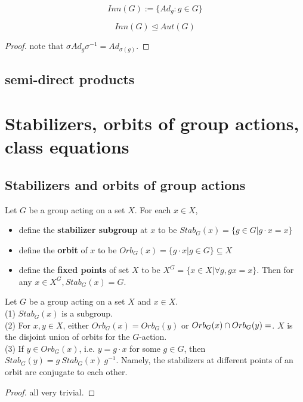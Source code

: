 \documentclass[11pt,fleqn]{book} %
\begin{document}
\begin{CJK}{UTF8}{gkai}
\begin{definition}
	\[Inn(G) := \{Ad_g: g\in G\}\]
\end{definition}
\begin{proposition}
	\[Inn(G) \unlhd Aut(G)\]
\end{proposition}
\begin{proof}
	note that $\sigma Ad_g \sigma^{-1} = Ad_{\sigma(g)} $.
\end{proof}

\subsection{semi-direct products}

\section{Stabilizers, orbits of group actions, class equations}
\subsection{Stabilizers and orbits of group actions}

\begin{definition}
	Let $G$ be a group acting on a set $X$. For each $x \in X$,
	\begin{itemize}
		\item define the {\bf stabilizer subgroup} at $x$ to be $Stab_G(x)=\{g\in G| g\cdot x = x\}$
		\item define the {\bf orbit} of $x$ to be $Orb_G(x) = \{g\cdot x | g \in G\}\subseteq X$ 	
		\item define the {\bf fixed points} of set $X$ to be $X^G = \{x \in X | \forall g, gx = x\}$. Then for any $x \in X^G, Stab_G(x) = G$.
	\end{itemize}
\end{definition}

\begin{proposition}
	Let $G$ be a group acting on a set $X$ and $x\in X$. \\
	(1) $Stab_G(x)$ is a subgroup. \\
	(2) For $x,y \in X$, either $Orb_G(x) = Orb_G(y)$ or $Orb_G(x) \cap Orb_G(y) = \empty$. $X$ is the disjoint union of orbits for the $G$-action. \\
	(3) If $y \in Orb_G(x)$, i.e. $y = g\cdot x$ for some $g\in G$, then $Stab_G(y) = g \ Stab_G(x) \  g^{-1}$. Namely, the stabilizers at different points of an orbit are conjugate to each other.
\end{proposition}
\begin{proof}
	all very trivial.	
\end{proof}


\end{CJK}
\end{document}
